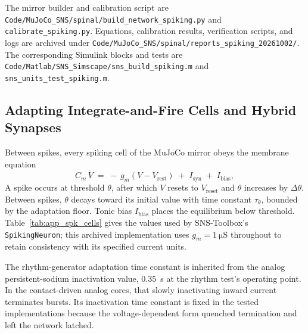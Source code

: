 The mirror builder and calibration script are \nolinkurl{Code/MuJoCo_SNS/spinal/build_network_spiking.py} and \nolinkurl{calibrate_spiking.py}. Equations, calibration results, verification scripts, and logs are archived under \nolinkurl{Code/MuJoCo_SNS/spinal/reports_spiking_20261002/}. The corresponding Simulink blocks and tests are \nolinkurl{Code/Matlab/SNS_Simscape/sns_build_spiking.m} and \nolinkurl{sns_units_test_spiking.m}.

\subsection{Adapting Integrate-and-Fire Cells and Hybrid Synapses}

Between spikes, every spiking cell of the MuJoCo mirror obeys the membrane equation
\begin{equation}
    C_{m}\,\dot{V} \;=\; -\,g_{m}\left(V - V_{\text{rest}}\right)
        \;+\; I_{\text{syn}} \;+\; I_{\text{bias}},
    \label{eq:app_lif}
\end{equation}
A spike occurs at threshold $\theta$, after which $V$ resets to $V_{\text{reset}}$ and $\theta$ increases by $\Delta\theta$. Between spikes, $\theta$ decays toward its initial value with time constant $\tau_{\theta}$, bounded by the adaptation floor. Tonic bias $I_{\text{bias}}$ places the equilibrium below threshold. Table~\ref{tab:app_spk_cells} gives the values used by SNS-Toolbox's \texttt{SpikingNeuron}; this archived implementation uses $g_m=\qty{1}{\micro\siemens}$ throughout to retain consistency with its specified current units.

The rhythm-generator adaptation time constant is inherited from the analog persistent-sodium inactivation value, \qty{0.35}{\second} at the rhythm test's operating point. In the contact-driven analog cores, that slowly inactivating inward current terminates bursts. Its inactivation time constant is fixed in the tested implementations because the voltage-dependent form quenched termination and left the network latched.

